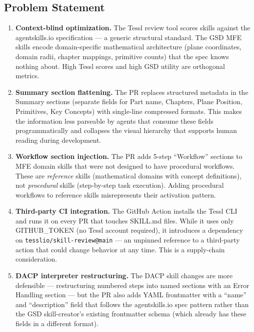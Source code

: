 \documentclass[11pt,letterpaper]{article}
\begin{document}
\subsection{Problem Statement}

\begin{enumerate}[leftmargin=2em]
\item \textbf{Context-blind optimization.} The Tessl review tool scores skills against the agentskills.io specification --- a generic structural standard. The GSD MFE skills encode domain-specific mathematical architecture (plane coordinates, domain radii, chapter mappings, primitive counts) that the spec knows nothing about. High Tessl scores and high GSD utility are orthogonal metrics.

\item \textbf{Summary section flattening.} The PR replaces structured metadata in the Summary sections (separate fields for Part name, Chapters, Plane Position, Primitives, Key Concepts) with single-line compressed formats. This makes the information less parseable by agents that consume these fields programmatically and collapses the visual hierarchy that supports human reading during development.

\item \textbf{Workflow section injection.} The PR adds 5-step ``Workflow'' sections to MFE domain skills that were not designed to have procedural workflows. These are \emph{reference} skills (mathematical domains with concept definitions), not \emph{procedural} skills (step-by-step task execution). Adding procedural workflows to reference skills misrepresents their activation pattern.

\item \textbf{Third-party CI integration.} The GitHub Action installs the Tessl CLI and runs it on every PR that touches SKILL.md files. While it uses only GITHUB\_TOKEN (no Tessl account required), it introduces a dependency on \texttt{tesslio/skill-review@main} --- an unpinned reference to a third-party action that could change behavior at any time. This is a supply-chain consideration.

\item \textbf{DACP interpreter restructuring.} The DACP skill changes are more defensible --- restructuring numbered steps into named sections with an Error Handling section --- but the PR also adds YAML frontmatter with a ``name'' and ``description'' field that follows the agentskills.io spec pattern rather than the GSD skill-creator's existing frontmatter schema (which already has these fields in a different format).
\end{enumerate}
\end{document}
